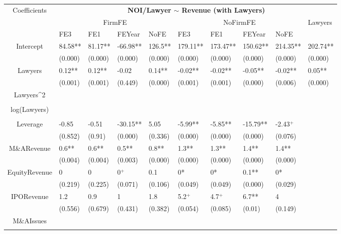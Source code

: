 \documentclass{article}
\begin{document}
\begin{table}[H]
\centering
\begin{tabular}{|clllllllll|}
\hline
\multirow{3}{*}{Coefficients} & \multicolumn{9}{c|}{\textbf{NOI/Lawyer $\sim$ Revenue (with Lawyers)}} \\
\cline{2-10}
& \multicolumn{4}{c}{FirmFE} & \multicolumn{4}{c}{NoFirmFE} & \multirow{2}{*}{Lawyers} \\
\cline{2-9}
& FE3 & FE1 & FEYear & NoFE & FE3 & FE1 & FEYear & NoFE &  \\
\hline
 
Intercept & 84.58** & 81.17** & -66.98** & 126.5** & 179.11** & 173.47** & 150.62** & 214.35** & 202.74** \\ 
   & (0.000) & (0.000) & (0.000) & (0.000) & (0.000) & (0.000) & (0.000) & (0.000) & (0.000) \\ 
  Lawyers & 0.12** & 0.12** & -0.02 & 0.14** & -0.02** & -0.02** & -0.05** & -0.02** & 0.05** \\ 
   & (0.001) & (0.001) & (0.449) & (0.000) & (0.001) & (0.001) & (0.000) & (0.006) & (0.000) \\ 
  Lawyers^2 &  &  &  &  &  &  &  &  &  \\ 
   &  &  &  &  &  &  &  &  &  \\ 
  log(Lawyers) &  &  &  &  &  &  &  &  &  \\ 
   &  &  &  &  &  &  &  &  &  \\ 
  Leverage & -0.85 & -0.51 & -30.15** & 5.05 & -5.99** & -5.85** & -15.79** & -2.43$^{+}$ &  \\ 
   & (0.852) & (0.91) & (0.000) & (0.336) & (0.000) & (0.000) & (0.000) & (0.076) &  \\ 
  M\&ARevenue & 0.6** & 0.6** & 0.5** & 0.8** & 1.3** & 1.3** & 1.4** & 1.4** &  \\ 
   & (0.004) & (0.004) & (0.003) & (0.000) & (0.000) & (0.000) & (0.000) & (0.000) &  \\ 
  EquityRevenue & 0 & 0 & 0$^{+}$ & 0.1 & 0* & 0* & 0.1** & 0* &  \\ 
   & (0.219) & (0.225) & (0.071) & (0.106) & (0.049) & (0.049) & (0.000) & (0.029) &  \\ 
  IPORevenue & 1.2 & 0.9 & 1 & 1.8 & 5.2$^{+}$ & 4.7$^{+}$ & 6.7** & 4 &  \\ 
   & (0.556) & (0.679) & (0.431) & (0.382) & (0.054) & (0.085) & (0.01) & (0.149) &  \\ 
  M\&AIssues &  &  &  &  &  &  &  &  &  \\ 
   &  &  &  &  &  &  &  &  &  \\ 

\end{tabular}
\end{table}
\end{document}
